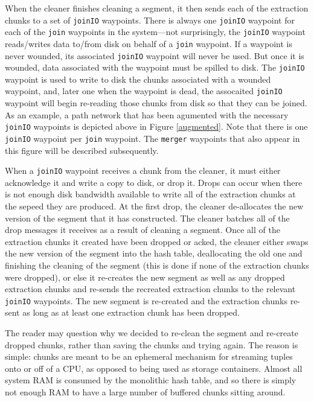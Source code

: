 \documentclass{sig-alternate}
\renewcommand\:{\colon} %
\begin{document}
When the cleaner finishes cleaning a segment, it then sends each of the extraction chunks to a set of \texttt{joinIO} waypoints.
There is always one \texttt{joinIO} waypoint for each of the \texttt{join} waypoints in the system---not surprisingly,
the \texttt{joinIO} waypoint reads/writes data to/from disk on behalf of a \texttt{join} waypoint.
If a waypoint is never wounded, its associated \texttt{joinIO} waypoint will never be used.
But once it is wounded, data associated with the waypoint must be spilled to disk.  The \texttt{joinIO} waypoint is used to write to disk the 
chunks associated with a wounded waypoint, and, later one when the waypoint is dead, the assocaited \texttt{joinIO} waypoint will begin
re-reading those chunks from disk so that they can be joined.
As an example, a path network 
that has been agumented with the necessary \texttt{joinIO} waypoints is depicted above in Figure \ref{augmented}.
Note that there is one \texttt{joinIO} waypoint per \texttt{join} waypoint.
The \texttt{merger} waypoints that also appear in this figure will be described subsequently.

When a \texttt{joinIO} waypoint receives a chunk from the cleaner, it must either acknowledge it and write a copy to disk, or drop it.
Drops can occur when there is not enough disk bandwidth available to write all of the 
extraction chunks at the sepeed
they are produced.  
At the first drop,
the cleaner de-allocates the new version of the segment that it has constructed.
The cleaner batches all of the drop messages it receives as a result of cleaning a segment.  
Once all of the
extraction chunks it created have been dropped or acked, the cleaner 
either swaps the new version of the segment into the hash table, deallocating
the old one and finishing the cleaning of the segment (this is done if none of the extraction chunks were dropped), 
or else it re-creates the new segment as well as any dropped
extraction chunks and re-sends the recreated extraction chunks to the relevant \texttt{joinIO} waypoints.  
The new segment is re-created and the extraction chunks re-sent as long as at least one extraction chunk has been dropped.

The reader may question why we decided to re-clean the segment and re-create dropped chunks, rather than
saving the chunks and trying again.  
The reason is simple: chunks are meant to be an ephemeral mechanism for streaming tuples onto or off of a CPU, 
as opposed to being used as storage containers.
Almost all system RAM is consumed by the monolithic hash table, and so there is simply not enough RAM to have a large number of buffered chunks
sitting around.  
\end{document}
